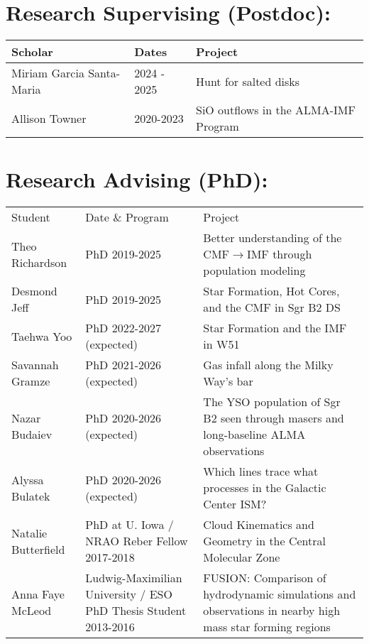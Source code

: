 \vspace{0.5cm}

\begin{minipage}{\textwidth}
\setlength{\extrarowheight}{4pt}
\section*{Research Supervising (Postdoc): }
\vspace{-12pt}
\begin{tabular}{lp{2.1in}p{2.6in}}
    Scholar & Dates  &   Project \\
    \hline
    Miriam Garcia Santa-Maria &  2024 - 2025 & Hunt for salted disks \\
    Allison Towner            &  2020-2023  & SiO outflows in the ALMA-IMF Program \\
\end{tabular}
\end{minipage}

\vspace{0.5cm}

\begin{minipage}{\textwidth}
\setlength{\extrarowheight}{4pt}
\section*{Research Advising (PhD): }
\vspace{-12pt}
\begin{tabular}{lp{2.1in}p{2.6in}}
    Student & Date  \& Program &   Project \\
    Theo Richardson     &  PhD 2019-2025  & Better understanding of the CMF$\rightarrow$IMF through population modeling  \\
    Desmond Jeff        &  PhD 2019-2025  & Star Formation, Hot Cores, and the CMF in Sgr B2 DS \\
    \hline
    Taehwa Yoo          &  PhD 2022-2027 (expected) & Star Formation and the IMF in W51 \\
    Savannah Gramze     &  PhD 2021-2026 (expected) & Gas infall along the Milky Way's bar \\
    Nazar Budaiev       &  PhD 2020-2026 (expected) & The YSO population of Sgr B2 seen through masers and long-baseline ALMA observations  \\
    Alyssa Bulatek      &  PhD 2020-2026 (expected) & Which lines trace what processes in the Galactic Center ISM?  \\
    \hline
    Natalie Butterfield &  PhD at U. Iowa / NRAO Reber Fellow 2017-2018   &                     Cloud Kinematics and Geometry in the Central Molecular Zone \\
    Anna Faye McLeod    &  Ludwig-Maximilian University / ESO PhD Thesis Student 2013-2016  &  FUSION: Comparison of hydrodynamic simulations and observations in nearby high mass star forming regions  \\
\end{tabular}
\end{minipage}


